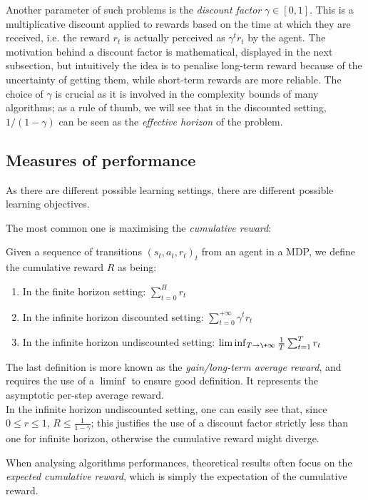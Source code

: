 Another parameter of such problems is the \emph{discount factor} $\gamma \in [0, 1]$. This is a multiplicative discount applied to rewards based on the time at which they are received, i.e. the reward $r_t$ is actually perceived as $\gamma^t r_t$ by the agent. The motivation behind a discount factor is mathematical, displayed in the next subsection, but intuitively the idea is to penalise long-term reward because of the uncertainty of getting them, while short-term rewards are more reliable. The choice of $\gamma$ is crucial as it is involved in the complexity bounds of many algorithms; as a rule of thumb, we will see that in the discounted setting, $1/(1 - \gamma)$ can be seen as the \emph{effective horizon} of the problem.

\subsection{Measures of performance}
\label{subsec:MDP-measures}

As there are different possible learning settings, there are different possible learning objectives.

The most common one is maximising the \emph{cumulative reward}:

\begin{defi}
  Given a sequence of transitions $(s_t, a_t, r_t)_t$ from an agent in a MDP, we define the cumulative reward $R$ as being:
  \begin{enumerate}
  \item In the finite horizon setting: $\sum_{t=0}^{H}r_t$
  \item In the infinite horizon discounted setting: $\sum_{t=0}^{+\infty} \gamma^t r_t$
  \item In the infinite horizon undiscounted setting: $\liminf_{T \to \+\infty} \frac{1}{T}\sum_{t=1}^{T} r_t$
  \end{enumerate}
  The last definition is more known as the \emph{gain/long-term average reward}, and requires the use of a $\liminf$ to ensure good definition. It represents the asymptotic per-step average reward.\\
  In the infinite horizon undiscounted setting, one can easily see that, since $0 \leq r \leq 1$, $R \leq \frac{1}{1 - \gamma}$; this justifies the use of a discount factor strictly less than one for infinite horizon, otherwise the cumulative reward might diverge.
\end{defi}

When analysing algorithms performances, theoretical results often focus on the \emph{expected cumulative reward}, which is simply the expectation of the cumulative reward.\\[1.5\lineskip]

